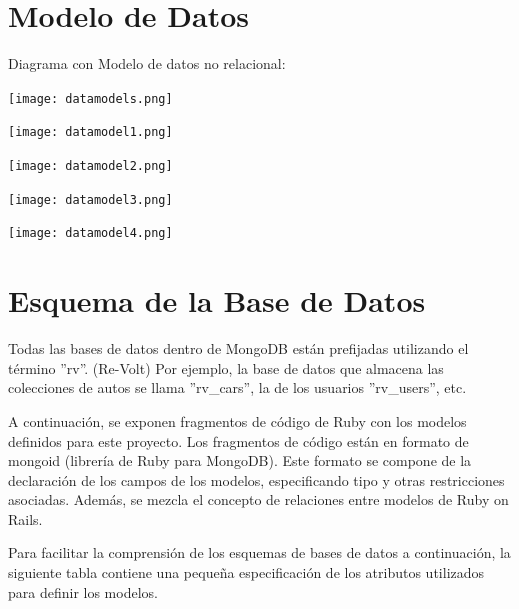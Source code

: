 \section{Modelo de Datos}
Diagrama con Modelo de datos no relacional:

\begin{center}
  \texttt{[image: datamodels.png]}
\end{center}

\begin{center}
	\texttt{[image: datamodel1.png]}
\end{center}

\begin{center}
	\texttt{[image: datamodel2.png]}
\end{center}

\begin{center}
	\texttt{[image: datamodel3.png]}
\end{center}

\begin{center}
	\texttt{[image: datamodel4.png]}
\end{center}

\section{Esquema de la Base de Datos}
Todas las bases de datos dentro de MongoDB están prefijadas utilizando el término ''rv''. (Re-Volt) Por ejemplo, la base de datos que almacena las colecciones de autos se llama ''rv\_cars'', la de los usuarios ''rv\_users'', etc.

A continuación, se exponen fragmentos de código de Ruby con los modelos definidos para este proyecto. Los fragmentos de código están en formato de mongoid (librería de Ruby para MongoDB). Este formato se compone de la declaración de los campos de los modelos, especificando tipo y otras restricciones asociadas. Además, se mezcla el concepto de relaciones entre modelos de Ruby on Rails.

Para facilitar la comprensión de los esquemas de bases de datos a continuación, la siguiente tabla contiene una pequeña especificación de los atributos utilizados para definir los modelos.

